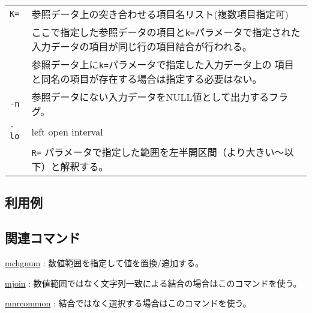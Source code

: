\begin{table}[htbp]
{\begin{tabular}{ll}
\verb|K=|    & 参照データ上の突き合わせる項目名リスト(複数項目指定可)\\
             & ここで指定した参照データの項目と\verb|k=|パラメータで指定された
               入力データの項目が同じ行の項目結合が行われる。\\
             & 参照データ上に\verb|k=|パラメータで指定した入力データ上の
               項目と同名の項目が存在する場合は指定する必要はない。\\
\verb|-n|    & 参照データにない入力データをNULL値として出力するフラグ。\\
\verb|-lo|   & left open interval\\
             &\verb|R=| パラメータで指定した範囲を左半開区間（より大きい～以下）と解釈する。\\
\end{tabular} 
}
\end{table} 


\subsection*{利用例}

\subsection*{関連コマンド}
\hyperref[sect:mchgnum]{mchgnum} : 数値範囲を指定して値を置換/追加する。

\hyperref[sect:mjoin]{mjoin} : 数値範囲ではなく文字列一致による結合の場合はこのコマンドを使う。

\hyperref[sect:mnrcommon]{mnrcommon} : 結合ではなく選択する場合はこのコマンドを使う。

%

